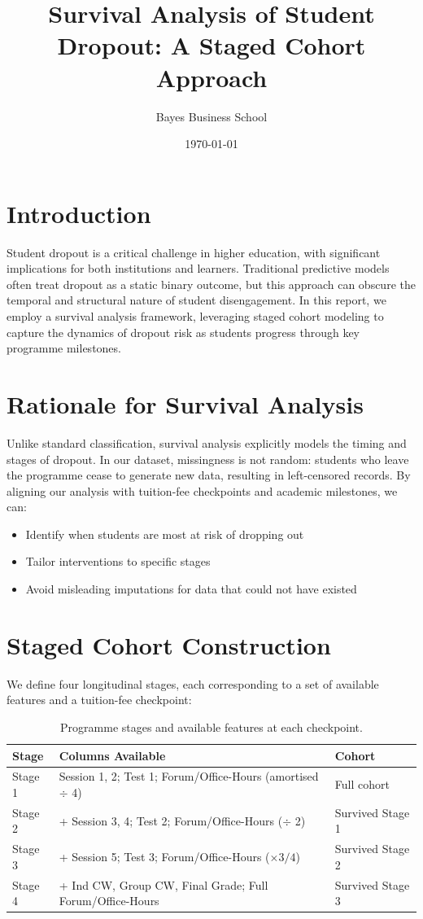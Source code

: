 \documentclass[12pt]{article}
\title{Survival Analysis of Student Dropout: A Staged Cohort Approach}
\author{Bayes Business School}
\date{\today}
\begin{document}
\maketitle

\section{Introduction}
Student dropout is a critical challenge in higher education, with significant implications for both institutions and learners. Traditional predictive models often treat dropout as a static binary outcome, but this approach can obscure the temporal and structural nature of student disengagement. In this report, we employ a survival analysis framework, leveraging staged cohort modeling to capture the dynamics of dropout risk as students progress through key programme milestones.

\section{Rationale for Survival Analysis}
Unlike standard classification, survival analysis explicitly models the timing and stages of dropout. In our dataset, missingness is not random: students who leave the programme cease to generate new data, resulting in left-censored records. By aligning our analysis with tuition-fee checkpoints and academic milestones, we can:
\begin{itemize}
    \item Identify when students are most at risk of dropping out
    \item Tailor interventions to specific stages
    \item Avoid misleading imputations for data that could not have existed
\end{itemize}

\section{Staged Cohort Construction}
We define four longitudinal stages, each corresponding to a set of available features and a tuition-fee checkpoint:

\begin{table}[h!]
\centering
\begin{tabular}{lll}
\toprule
Stage & Columns Available & Cohort \\
\midrule
Stage 1 & Session 1, 2; Test 1; Forum/Office-Hours (amortised $\div$ 4) & Full cohort \\
Stage 2 & + Session 3, 4; Test 2; Forum/Office-Hours ($\div$ 2) & Survived Stage 1 \\
Stage 3 & + Session 5; Test 3; Forum/Office-Hours ($\times 3/4$) & Survived Stage 2 \\
Stage 4 & + Ind CW, Group CW, Final Grade; Full Forum/Office-Hours & Survived Stage 3 \\
\bottomrule
\end{tabular}
\caption{Programme stages and available features at each checkpoint.}
\end{table}
\end{document}

